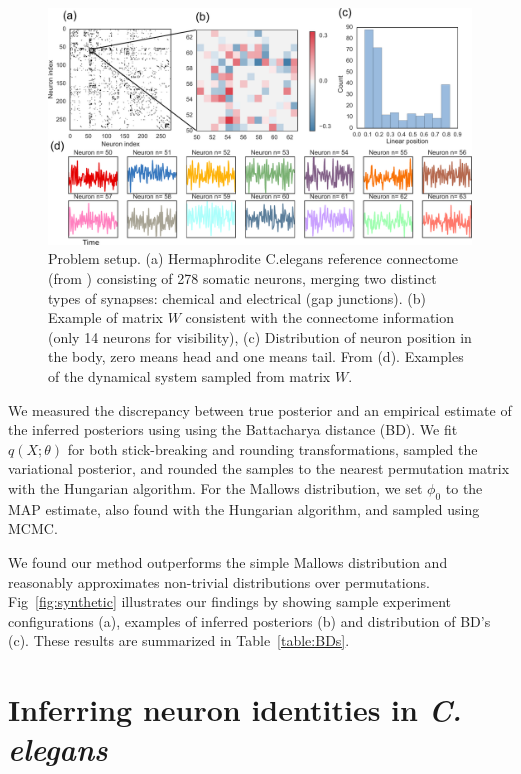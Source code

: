 \documentclass[twoside]{article}
\begin{document}
\begin{figure}[ht]
  \centering
  \includegraphics[width=1.0\textwidth]{../figures/figure6.pdf} 
  \caption{Problem setup. (a) Hermaphrodite C.elegans reference
    connectome (from \cite{varshney2011structural,wormatlas})
    consisting of 278 somatic neurons, merging two distinct types of
    synapses: chemical and electrical (gap junctions). (b) Example of
    matrix $W$ consistent with the connectome information (only 14
    neurons for visibility), (c) Distribution of neuron position in
    the body, zero means head and one means tail. From
    \cite{white1986structure,wormatlas} (d). Examples of the dynamical
    system sampled from matrix $W$.}
  \label{fig:connectome}
\end{figure}

We measured the discrepancy between true posterior and an empirical
estimate of the inferred posteriors using using the Battacharya
distance (BD). We fit $q(X; \theta)$ for both stick-breaking and
rounding transformations, sampled the variational posterior, and
rounded the samples to the nearest permutation matrix with the
Hungarian algorithm. For the Mallows distribution, we set $\phi_0$ to
the MAP estimate, also found with the Hungarian algorithm, and sampled
using MCMC.
 
We found our method outperforms the simple Mallows distribution
and reasonably approximates non-trivial distributions
over permutations. Fig~\ref{fig:synthetic} illustrates our findings
by showing sample experiment configurations (a), examples of inferred
posteriors (b) and distribution of BD's (c). These results are
summarized in Table~\ref{table:BDs}.


\section{Inferring neuron identities in \textit{C. elegans}}
\label{sec:celegans}
\end{document}
